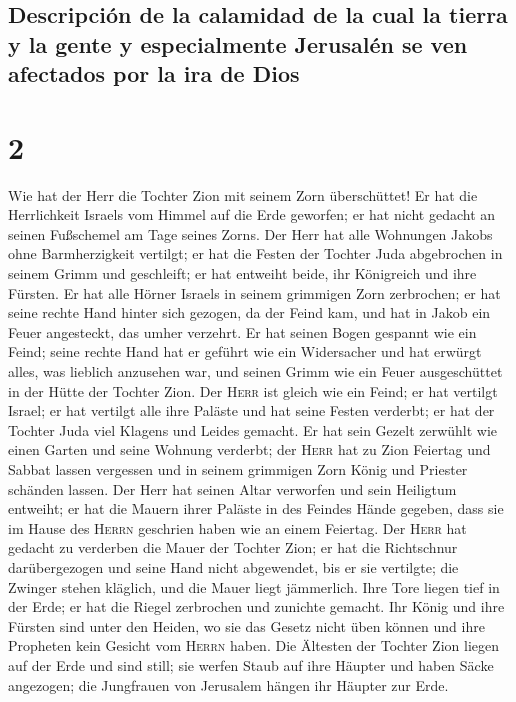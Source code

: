 \hypertarget{descripciuxf3n-de-la-calamidad-de-la-cual-la-tierra-y-la-gente-y-especialmente-jerusaluxe9n-se-ven-afectados-por-la-ira-de-dios}{%
\subsection{Descripción de la calamidad de la cual la tierra y la gente
y especialmente Jerusalén se ven afectados por la ira de
Dios}\label{descripciuxf3n-de-la-calamidad-de-la-cual-la-tierra-y-la-gente-y-especialmente-jerusaluxe9n-se-ven-afectados-por-la-ira-de-dios}}

\hypertarget{section-1}{%
\section{2}\label{section-1}}

 Wie hat der Herr die Tochter Zion mit seinem Zorn
überschüttet! Er hat die Herrlichkeit Israels vom Himmel auf die Erde
geworfen; er hat nicht gedacht an seinen Fußschemel am Tage seines
Zorns.  Der Herr hat alle Wohnungen Jakobs ohne
Barmherzigkeit vertilgt; er hat die Festen der Tochter Juda abgebrochen
in seinem Grimm und geschleift; er hat entweiht beide, ihr Königreich
und ihre Fürsten.  Er hat alle Hörner Israels in seinem
grimmigen Zorn zerbrochen; er hat seine rechte Hand hinter sich gezogen,
da der Feind kam, und hat in Jakob ein Feuer angesteckt, das umher
verzehrt.  Er hat seinen Bogen gespannt wie ein Feind;
seine rechte Hand hat er geführt wie ein Widersacher und hat erwürgt
alles, was lieblich anzusehen war, und seinen Grimm wie ein Feuer
ausgeschüttet in der Hütte der Tochter Zion.  Der
\textsc{Herr} ist gleich wie ein Feind; er hat vertilgt Israel; er hat
vertilgt alle ihre Paläste und hat seine Festen verderbt; er hat der
Tochter Juda viel Klagens und Leides gemacht.  Er hat sein
Gezelt zerwühlt wie einen Garten und seine Wohnung verderbt; der
\textsc{Herr} hat zu Zion Feiertag und Sabbat lassen vergessen und in
seinem grimmigen Zorn König und Priester schänden lassen. 
Der Herr hat seinen Altar verworfen und sein Heiligtum entweiht; er hat
die Mauern ihrer Paläste in des Feindes Hände gegeben, dass sie im Hause
des \textsc{Herrn} geschrien haben wie an einem Feiertag. 
Der \textsc{Herr} hat gedacht zu verderben die Mauer der Tochter Zion;
er hat die Richtschnur darübergezogen und seine Hand nicht abgewendet,
bis er sie vertilgte; die Zwinger stehen kläglich, und die Mauer liegt
jämmerlich.  Ihre Tore liegen tief in der Erde; er hat die
Riegel zerbrochen und zunichte gemacht. Ihr König und ihre Fürsten sind
unter den Heiden, wo sie das Gesetz nicht üben können und ihre Propheten
kein Gesicht vom \textsc{Herrn} haben.  Die Ältesten der
Tochter Zion liegen auf der Erde und sind still; sie werfen Staub auf
ihre Häupter und haben Säcke angezogen; die Jungfrauen von Jerusalem
hängen ihr Häupter zur Erde.

